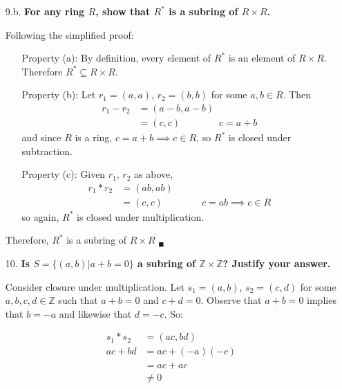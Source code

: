 \documentclass{article}
\begin{document}
\begin{enumerate}
		\item [9.b.] \textbf{For any ring $R$, show that $R^*$ is a subring of $R \times R$.}

			Following the simplified proof:
			\begin{enumerate}
				\item [Property (a):] By definition, every element of $R^*$ is an element of 
					$R \times R$. Therefore $R^* \subseteq R \times R$.
				\item [Property (b):] Let $r_1 = (a, a)$, $r_2 = (b, b)$ for some $a, b \in R$. 
					Then 
					\begin{align*}
						r_1 - r_2 & = (a - b, a - b) \\
								  & = (c, c) \qquad \qquad c = a + b
					\end{align*}
					and since $R$ is a ring, $c = a + b \implies c \in R$, so $R^*$ is closed under 
					subtraction.
				\item [Property (c):] Given $r_1$, $r_2$ as above,
					\begin{align*}
						r_1 * r_2 & = (ab, ab) \\
								  & = (c, c) \qquad \qquad c = ab \implies c \in R
					\end{align*}
					so again, $R^*$ is closed under multiplication.
			\end{enumerate}

			Therefore, $R^*$ is a subring of $R \times R$ $_{\blacksquare}$

		\item [10.] \textbf{Is $S = \lbrace (a, b) | a + b = 0 \rbrace$ a subring of $\mathbb{Z} 
						\times \mathbb{Z}$? Justify your answer.}

			Consider closure under multiplication. Let $s_1 = (a, b)$, $s_2 = (c, d)$ for some 
			$a, b, c, d \in \mathbb{Z}$ such that $a + b = 0$ and $c + d = 0$. Observe that 
			$a + b = 0$ implies that $b = -a$ and likewise that $d = -c$. So:
			
			\begin{align*}
				s_1 * s_2 & = (ac, bd) \\
				ac + bd & = ac + (-a)(-c) \\
						& = ac + ac \\
						& \neq 0
			\end{align*}
			

\end{enumerate}
\end{document}
